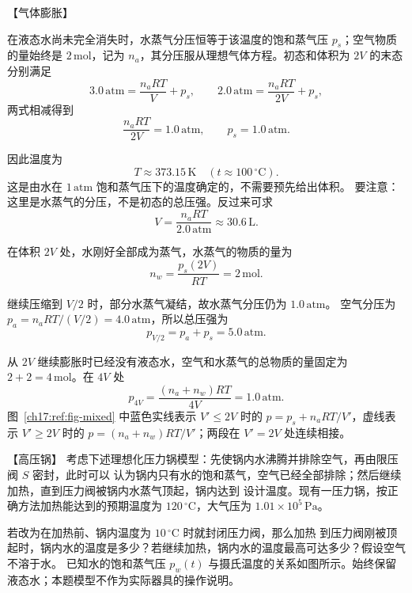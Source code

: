 {\begin{origexamplebox}{【气体膨胀】}
\ThQWetExpansion
\end{origexamplebox}

\begin{xesolution}
在液态水尚未完全消失时，水蒸气分压恒等于该温度的饱和蒸气压 $p_s$；空气物质的量始终是
$2\,\mathrm{mol}$，记为 $n_a$，其分压服从理想气体方程。初态和体积为 $2V$ 的末态分别满足
\[
  3.0\,\mathrm{atm}=\frac{n_aRT}{V}+p_s,
  \qquad
  2.0\,\mathrm{atm}=\frac{n_aRT}{2V}+p_s,
\]
两式相减得到
\[
  \frac{n_aRT}{2V}=1.0\,\mathrm{atm},
  \qquad p_s=1.0\,\mathrm{atm}.
\]

\par\noindent\begin{minipage}{\linewidth}
\mixedGasPVFigure
{}\label{ch17:ref:fig-mixed}
\end{minipage}\par\medskip

因此温度为
\[
  \boxed{T\approx373.15\,\mathrm K\quad(t\approx100\,{}^\circ\mathrm C)}.
\]
这是由水在 $1\,\mathrm{atm}$ 饱和蒸气压下的温度确定的，不需要预先给出体积。
要注意：这里是水蒸气的分压，不是初态的总压强。反过来可求
\[V=\frac{n_aRT}{2.0\,\mathrm{atm}}\approx30.6\,\mathrm L.\]

在体积 $2V$ 处，水刚好全部成为蒸气，水蒸气的物质的量为
\[
  n_w=\frac{p_s(2V)}{RT}=2\,\mathrm{mol}.
\]

继续压缩到 $V/2$ 时，部分水蒸气凝结，故水蒸气分压仍为 $1.0\,\mathrm{atm}$。
空气分压为 $p_a=n_aRT/(V/2)=4.0\,\mathrm{atm}$，所以总压强为
\[
  \boxed{p_{V/2}=p_a+p_s=5.0\,\mathrm{atm}}.
\]

从 $2V$ 继续膨胀时已经没有液态水，空气和水蒸气的总物质的量固定为 $2+2=4\,\mathrm{mol}$。在
$4V$ 处
\[
  \boxed{p_{4V}=\frac{(n_a+n_w)RT}{4V}=1.0\,\mathrm{atm}}.
\]
图~\ref{ch17:ref:fig-mixed} 中蓝色实线表示 $V'\le2V$ 时的 $p=p_s+n_aRT/V'$，虚线表示 $V'\ge2V$ 时的 $p=(n_a+n_w)RT/V'$；两段在
$V'=2V$ 处连续相接。
\end{xesolution}

\begin{origexamplebox}{【高压锅】}\label{ch17:ex:s31-22-4}
考虑下述理想化压力锅模型：先使锅内水沸腾并排除空气，再由限压阀 $S$ 密封，此时可以
认为锅内只有水的饱和蒸气，空气已经全部排除；然后继续加热，直到压力阀被锅内水蒸气顶起，锅内达到
设计温度。现有一压力锅，按正确方法加热能达到的预期温度为 $120\,{}^{\circ}\mathrm C$，大气压为
$1.01\times10^5\,\mathrm{Pa}$。

若改为在加热前、锅内温度为 $10\,{}^{\circ}\mathrm C$ 时就封闭压力阀，那么加热
到压力阀刚被顶起时，锅内水的温度是多少？若继续加热，锅内水的温度最高可达多少？假设空气不溶于水。
已知水的饱和蒸气压 $p_w(t)$ 与摄氏温度的关系如图所示。始终保留液态水；本题模型不作为实际器具的操作说明。
\par\noindent\begin{minipage}{\linewidth}
\pressureCookerQuestionFigure
{}\label{ch17:ref:fig-cooker-given}
\end{minipage}\par\medskip
\end{origexamplebox}

}
